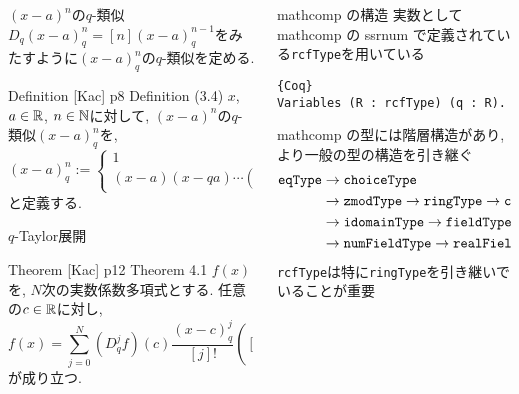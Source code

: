 \documentclass[unicode,mathserif]{beamer}
\begin{document}
\begin{frame}[fragile]
\begin{columns}[T]
\begin{column}{0.33\columnwidth}
		\begin{block}{$(x - a)^n$の$q$-類似}
			$D_q(x-a)^n_q = [n](x-a)^{n-1}_q$をみたすように$(x - a)^n_q$の$q$-類似を定める. 
			\begin{itembox}{Definition [Kac] p8 Definition (3.4)}
			$x$, $a \in \mathbb R$, $n \in \mathbb N$に対して, $(x - a)^n$の$q$-類似$(x - a)^n_q$を, 
			\[
				(x - a)^n_q := \begin{cases}
					1 & \text{if}\ n = 0 \\
					(x - a) (x - qa) \cdots (x - q^{n - 1} a) & \text{if}\ n \ge 1
				\end{cases}
			\]
			と定義する.
			\end{itembox}
		\end{block}
		
		\begin{block}{$q$-Taylor展開}
			\begin{itembox}{Theorem [Kac] p12 Theorem 4.1}
				$f(x)$を, $N$次の実数係数多項式とする. 任意の$c\in\mathbb R$に対し, 
				\[
					f(x) = \sum_{j=0}^N (D_q^jf)(c)\frac{(x-c)^j_q}{[j]!}
						\left( [n]! := \begin{cases}
													1 & (n=0)\\
													[n]\times[n-1]\times\cdots\times[1] & (n\ge1)
												\end{cases}
						\right)
				\]
				が成り立つ.
			\end{itembox}
		\end{block}
	\end{column}
	\begin{column}{0.33\columnwidth}
		\begin{block}{mathcomp の構造}
			実数として mathcomp の ssrnum で定義されている{\tt rcfType}を用いている
			\begin{lstlisting}{Coq}
Variables (R : rcfType) (q : R). \end{lstlisting}			
			mathcomp の型には階層構造があり, より一般の型の構造を引き継ぐ
			\begin{align*}
  			{\tt eqType} &\to {\tt choiceType} \\
                   &\to {\tt zmodType} \to {\tt ringType} \to 
                          {\tt comRingType} \to {\tt comUnitRingType} \\
						&\to {\tt idomainType} \to {\tt fieldType}\\
                   &\to {\tt numFieldType} \to {\tt realFieldType} \to {\tt rcfType}
			\end{align*}
			{\tt rcfType}は特に{\tt ringType}を引き継いでいることが重要
			

\end{block}
\end{column}
\end{columns}
\end{frame}
\end{document}
